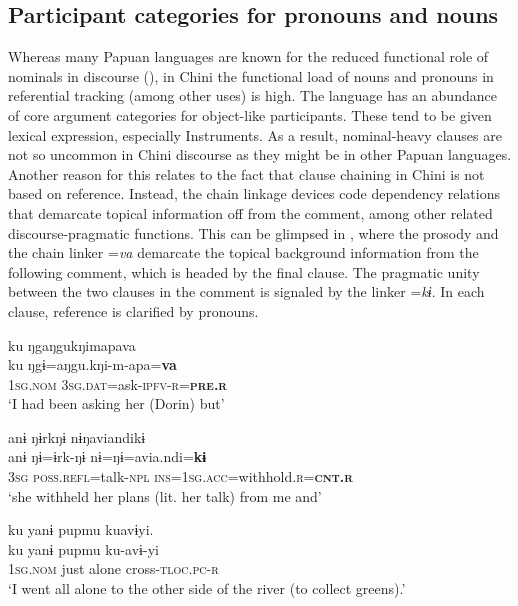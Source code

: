 \documentclass[output=paper]{langscibook}
\begin{document}
\subsection{{Participant} {categories} {for} {pronouns} {and} {nouns}}\label{sec:brooks:2.2}

Whereas many Papuan languages are known for the reduced functional role of nominals in discourse (\citealt{DeVries2005}), in Chini the functional load of nouns and pronouns in referential tracking (among other uses) is high. The language has an abundance of core argument categories for object-like participants. These tend to be given lexical expression, especially Instruments. As a result, nominal-heavy clauses are not so uncommon in Chini discourse as they might be in other Papuan languages. Another reason for this relates to the fact that clause chaining in Chini is not based on reference. Instead, the chain linkage devices code dependency relations that demarcate topical information off from the comment, among other related discourse-pragmatic functions. This can be glimpsed in , where the prosody and the chain linker =\textit{va} demarcate the topical background information from the following comment, which is headed by the final clause. The pragmatic unity between the two clauses in the comment is signaled by the linker =\textit{kɨ}. In each clause, reference is clarified by pronouns.

\ea\label{ex:brooks:2}
\ea
\glll ku   ŋgaŋgukŋimapava\\
ku   ŋgɨ=aŋgu.kŋi-m-apa=\textbf{va}\\
\textsc{1sg.nom}  \textsc{3sg.dat}=ask\textsc{-ipfv-r=}\textbf{\textsc{pre.r}}\\
\glt `I had been asking her (Dorin) but'

\ex
\glll anɨ  ŋɨrkŋɨ    nɨŋaviandikɨ\\
anɨ  ŋɨ=ɨrk-ŋɨ   nɨ=ŋɨ=avia.ndi=\textbf{kɨ}\\
\textsc{3sg} \textsc{poss.refl}=talk-\textsc{npl} \textsc{ins=1sg.acc}=withhold.\textsc{r=}\textbf{\textsc{cnt.r}}\\
\glt `she withheld her plans (lit. her talk) from me and'

\ex
\glll ku   yanɨ  pupmu   kuavɨyi.\\
ku   yanɨ  pupmu  ku-avɨ-yi\\
\textsc{1sg.nom}  just  alone   cross-\textsc{tloc.pc-r}\\
\glt `I went all alone to the other side of the river (to collect greens).'
\end{document}
